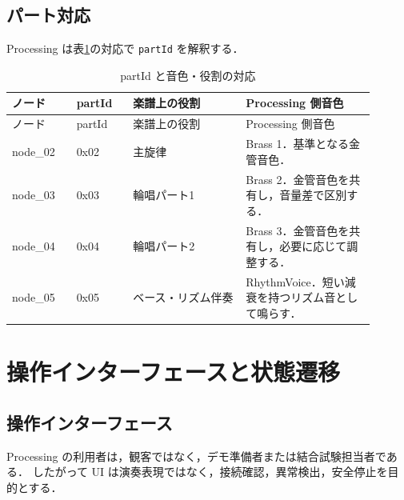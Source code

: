 \documentclass[lualatex,book,openany,paper=a4paper,jafontsize=11.5pt,jafontscale=1.05]{jlreq}
\begin{document}
\section{パート対応}
Processing は表\ref{tab:part-map}の対応で \texttt{partId} を解釈する．

\begin{longtable}{p{0.16\linewidth}p{0.14\linewidth}p{0.28\linewidth}p{0.32\linewidth}}
\caption{partId と音色・役割の対応}\label{tab:part-map}\\
\toprule
ノード & partId & 楽譜上の役割 & Processing 側音色 \\
\midrule
\endfirsthead
\toprule
ノード & partId & 楽譜上の役割 & Processing 側音色 \\
\midrule
\endhead
node\_02 & 0x02 & 主旋律 & Brass 1．基準となる金管音色． \\
node\_03 & 0x03 & 輪唱パート1 & Brass 2．金管音色を共有し，音量差で区別する． \\
node\_04 & 0x04 & 輪唱パート2 & Brass 3．金管音色を共有し，必要に応じて調整する． \\
node\_05 & 0x05 & ベース・リズム伴奏 & RhythmVoice．短い減衰を持つリズム音として鳴らす． \\
\bottomrule
\end{longtable}

\chapter{操作インターフェースと状態遷移}

\section{操作インターフェース}
Processing の利用者は，観客ではなく，デモ準備者または結合試験担当者である．
したがって UI は演奏表現ではなく，接続確認，異常検出，安全停止を目的とする．
\end{document}
